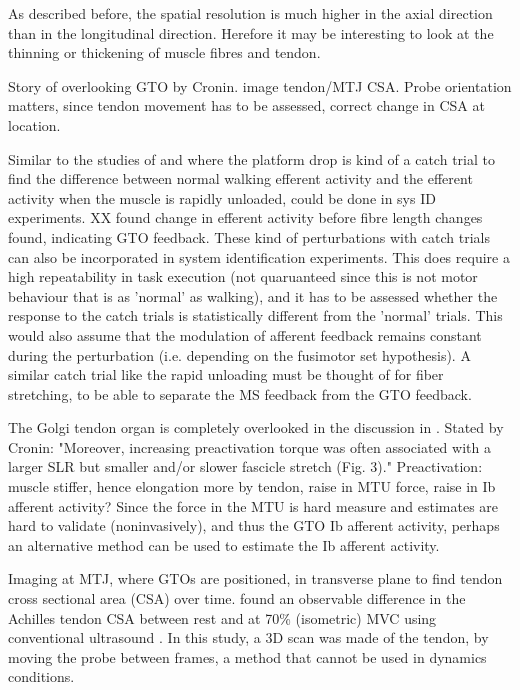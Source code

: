 As described before, the spatial resolution is much higher in the axial direction than in the longitudinal direction. Herefore it may be interesting to look at the thinning or thickening of muscle fibres and tendon. 

Story of overlooking GTO by Cronin. image tendon/MTJ CSA. Probe orientation matters, since tendon movement has to be assessed, correct change in CSA at location. 

Similar to the studies of \citet{af_klint_sudden_2009} and \citet{grey_positive_2007} where the platform drop is kind of a catch trial to find the difference between normal walking efferent activity and the efferent activity when the muscle is rapidly unloaded, could be done in sys ID experiments. XX found change in efferent activity before fibre length changes found, indicating GTO feedback. These kind of perturbations with catch trials can also be incorporated in system identification experiments. This does require a high repeatability in task execution (not quaruanteed since this is not motor behaviour that is as 'normal' as walking), and it has to be assessed whether the response to the catch trials is statistically different from the 'normal' trials. This would also assume that the modulation of afferent feedback remains constant during the perturbation (i.e. depending on the fusimotor set hypothesis). A similar catch trial like the rapid unloading must be thought of for fiber stretching, to be able to separate the MS feedback from the GTO feedback. 

The Golgi tendon organ is completely overlooked in the discussion in \citet{cronin_triceps_2015}. 
Stated by Cronin: "Moreover, increasing preactivation torque was often associated with a larger SLR but smaller and/or slower fascicle stretch (Fig. 3)." Preactivation: muscle stiffer, hence elongation more by tendon, raise in MTU force, raise in Ib afferent activity? 
Since the force in the MTU is hard measure and estimates are hard to validate (noninvasively), and thus the GTO Ib afferent activity, perhaps an alternative method can be used to estimate the Ib afferent activity. %

Imaging at MTJ, where GTOs are positioned, in transverse plane to find tendon cross sectional area (CSA) over time.  \citeauthor{obst_three-dimensional_2014} found an observable difference in the Achilles tendon CSA between rest and at 70\% (isometric) MVC using conventional ultrasound \cite{obst_three-dimensional_2014}. In this study, a 3D scan was made of the tendon, by moving the probe between frames, a method that cannot be used in dynamics conditions. 

